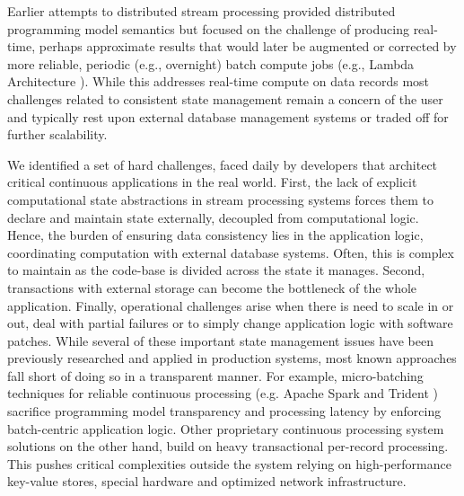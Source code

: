 Earlier attempts to distributed stream processing \cite{CUSTOM:web/Storm} provided distributed programming model semantics but focused on the challenge of producing real-time, perhaps approximate results that would later be augmented or corrected by more reliable, periodic (e.g., overnight) batch compute jobs (e.g., Lambda Architecture \cite{marz2015big}). While this addresses real-time compute on data records most challenges related to consistent state management remain a concern of the user and typically rest upon external database management systems or traded off for further scalability.


We identified a set of hard challenges, faced daily by developers that architect critical continuous applications in the real world. First, the lack of explicit computational state abstractions in stream processing systems forces them to declare and maintain state externally, decoupled from computational logic. Hence, the burden of ensuring data consistency lies in the application logic, coordinating computation with external database systems. Often, this is complex to maintain as the code-base is divided across the state it manages. Second, transactions with external storage can become the bottleneck of the whole application. Finally, operational challenges arise when there is need to scale in or out, deal with partial failures or to simply change application logic with software patches. While several of these important state management issues have been previously researched and applied in production systems, most known approaches fall short of doing so in a transparent manner. For example, micro-batching techniques for reliable continuous processing (e.g. Apache Spark and Trident \cite{zaharia2012discretized,CUSTOM:web/trident}) sacrifice programming model transparency and processing latency by enforcing batch-centric application logic. Other proprietary continuous processing system solutions \cite{millwheel} on the other hand, build on heavy transactional per-record processing. This pushes critical complexities outside the system relying on high-performance key-value stores, special hardware and optimized network infrastructure. 

